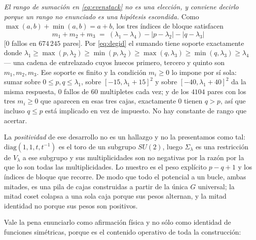 \documentclass[11pt,a4paper]{article}
\newcommand{\Sig}{\Sigma_\lambda}
\begin{document}
\emph{El rango de sumación en \eqref{eq:evenstack} no es una elección, y conviene decirlo porque un
rango no enunciado es una hipótesis escondida.} Como $\max(a,b)+\min(a,b)=a+b$, los tres índices de
bloque satisfacen
\begin{equation}\label{eq:degid}
m_1+m_2+m_3 \;=\; (\lambda_1-\lambda_4)-|p-\lambda_2|-|q-\lambda_3|
\end{equation}
[$0$ fallos en $674\,245$ pares]. Por \eqref{eq:degid} el sumando tiene soporte exactamente donde
$\lambda_1\ge\max(p,\lambda_2)\ge\min(p,\lambda_2)\ge\max(q,\lambda_3)\ge\min(q,\lambda_3)\ge\lambda_4$
--- una cadena de entrelazado cuyos huecos primero, tercero y quinto son $m_1,m_2,m_3$. Ese soporte es
finito y la condición $m_i\ge0$ lo impone por sí sola: sumar sobre $0\le p,q\le\lambda_1$, sobre
$[-15,\lambda_1{+}15]^2$ y sobre $[-40,\lambda_1{+}40]^2$ da la misma respuesta, $0$ fallos de $60$
multipletes cada vez; y de los $4104$ pares con los tres $m_i\ge0$ que aparecen en esas tres cajas,
exactamente $0$ tienen $q>p$, así que incluso $q\le p$ está implicado en vez de impuesto. No hay
constante de rango que acertar.

La \emph{positividad} de ese desarrollo no es un hallazgo y no la presentamos como tal:
$\mathrm{diag}(1,1,t,t^{-1})$ es el toro de un subgrupo $SU(2)$, luego $\Sig$ es una restricción de
$V_\lambda$ a ese subgrupo y sus multiplicidades son no negativas por la razón por la que lo son
todas las multiplicidades. Lo nuestro es el peso explícito $p-q+1$ y los índices de bloque que
recorre. De modo que todo el potencial a un bucle, ambas mitades, es una pila de cajas construidas a
partir de la única $G$ universal; la mitad coset colapsa a una sola caja porque sus pesos alternan, y
la mitad identidad no porque sus pesos son positivos.

Vale la pena enunciarlo como afirmación física y no sólo como identidad de funciones simétricas,
porque es el contenido operativo de toda la construcción:

\begin{center}
\end{center}
\end{document}
